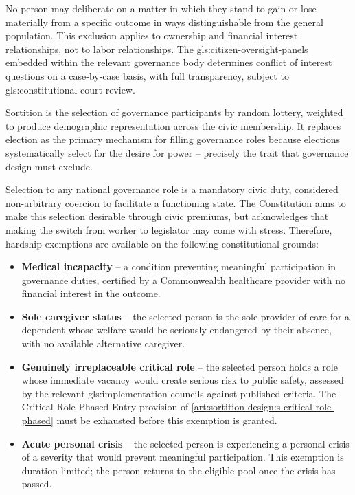 No person may deliberate on a matter in which they stand to gain or lose materially from a specific outcome in ways distinguishable from the general population. This exclusion applies to ownership and financial interest relationships, not to labor relationships. The \gls{gls:citizen-oversight-panels} embedded within the relevant governance body determines conflict of interest questions on a case-by-case basis, with full transparency, subject to \gls{gls:constitutional-court} review.


Sortition is the selection of governance participants by random lottery, weighted to produce demographic representation across the civic membership. It replaces election as the primary mechanism for filling governance roles because elections systematically select for the desire for power -- precisely the trait that governance design must exclude.

Selection to any national governance role is a mandatory civic duty, considered non-arbitrary coercion to facilitate a functioning state. The Constitution aims to make this selection desirable through civic premiums, but acknowledges that making the switch from worker to legislator may come with stress. Therefore, hardship exemptions are available on the following constitutional grounds:
\begin{itemize}
  \item \textbf{Medical incapacity} -- a condition preventing meaningful participation in governance duties, certified by a Commonwealth healthcare provider with no financial interest in the outcome.
  \item \textbf{Sole caregiver status} -- the selected person is the sole provider of care for a dependent whose welfare would be seriously endangered by their absence, with no available alternative caregiver.
  \item \textbf{Genuinely irreplaceable critical role} -- the selected person holds a role whose immediate vacancy would create serious risk to public safety, assessed by the relevant \gls{gls:implementation-councils} against published criteria. The Critical Role Phased Entry provision of \ref{art:sortition-design:s-critical-role-phased} must be exhausted before this exemption is granted.
  \item \textbf{Acute personal crisis} -- the selected person is experiencing a personal crisis of a severity that would prevent meaningful participation. This exemption is duration-limited; the person returns to the eligible pool once the crisis has passed.
\end{itemize}

